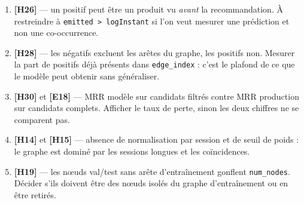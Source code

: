 \documentclass[11pt,a4paper]{article}
\newcommand{\code}[1]{\texttt{\small #1}}
\newcommand{\hyp}[1]{\textcolor{hypcol}{\textbf{\small [#1]}}}
\begin{document}
\begin{enumerate}[leftmargin=*]
  \item \hyp{H26} --- un positif peut être un produit vu \emph{avant} la
        recommandation. À restreindre à \code{emitted > logInstant} si l'on veut
        mesurer une prédiction et non une co-occurrence.
  \item \hyp{H28} --- les négatifs excluent les arêtes du graphe, les positifs non.
        Mesurer la part de positifs déjà présents dans \code{edge\_index} : c'est le
        plafond de ce que le modèle peut obtenir sans généraliser.
  \item \hyp{H30} et \hyp{E18} --- MRR modèle sur candidats filtrés contre MRR
        production sur candidats complets. Afficher le taux de perte, sinon les deux
        chiffres ne se comparent pas.
  \item \hyp{H14} et \hyp{H15} --- absence de normalisation par session et de seuil
        de poids : le graphe est dominé par les sessions longues et les coïncidences.
  \item \hyp{H19} --- les nœuds val/test sans arête d'entraînement gonflent
        \code{num\_nodes}. Décider s'ils doivent être des nœuds isolés du graphe
        d'entraînement ou en être retirés.
\end{enumerate}
\end{document}
